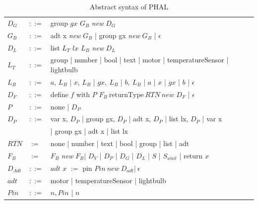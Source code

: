 \begin{table}[H]
\begin{tabular}{@{}lll@{}}
$D_G$       & $::=$ & group $gx$ $G_B$ \textit{new} $D_G$ \\
$G_B$      & $::=$ & adt x \textit{new} $G_B$ | group gx \textit{new} $G_B$ | $\epsilon$ \\
$D_L$     & $::=$ &  list $L_T$ $lx$ $L_B$ \textit{new} $D_L$ \\
$L_T $     & $::=$ &  group | number | bool | text | motor | temperatureSensor | lightbulb\\
$L_B $     & $::=$ &  $a$, $L_B$ | $x$, $L_B$ | $gx, \: L_B$ | $b, \: L_B$ | $a$ | $x$ | $gx$ | $b$ | $\epsilon$ \\
$D_F$       & $::=$ & define $f$ with $P$ $F_B \: \text{returnType} \: RTN \: \textit{new}$ $D_F$ | $\epsilon$ \\
$P$ & $::=$ & none | $D_P$ \\
$D_P$  & $::=$ & var x, $D_P$ | group gx, $D_P$ | adt x, $D_P$ | list lx, $D_P$ | var x \\
            & & | group gx | adt x | list lx  \\  
$RTN$       & $:=$ &  none | number | text | bool | group | list | adt\\
$F_B$       & $:=$ &  $F_B$ \textit{new} $F_B$| $D_V$ | $D_P$ | $D_G$ | $D_L$ | $S$ | $S_{wait}$ | return $x$\\
$D_{Adt}$   & $::=$ & $adt$ $x$ $:=$ pin $Pin \: new \: D_{adt} | \: \epsilon  $  \\ 
$adt$   & $::=$ & motor | temperatureSensor | lightbulb     \\ 
$Pin$       & $::=$ & $ n, Pin$ | $n$ \\
\bottomrule
\end{tabular}
\caption{Abstract syntax of PHAL}
\label{tab:syntacticformation}
\end{table}
\noindent 
